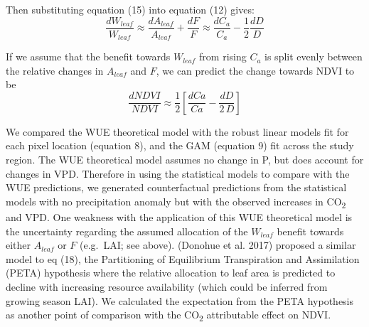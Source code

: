 \documentclass[
]{article}
\begin{document}
Then substituting equation (15) into equation (12) gives:
\begin{equation}
\frac{dW_{leaf}}{W_{leaf}} \approx  \frac{dA_{leaf}}{A_{leaf}} + \frac{dF}{F} \approx \frac{dC_a}{C_a} - \frac{1}{2}\frac{dD}{D}
\end{equation}

If we assume that the benefit towards \(W_{leaf}\) from rising \(C_a\)
is split evenly between the relative changes in \(A_{leaf}\) and \(F\),
we can predict the change towards NDVI to be \begin{equation}
\frac{dNDVI}{NDVI} \approx \frac{1}{2}[\frac{dCa}{Ca}-\frac{dD}{2\,D}]
\end{equation}

We compared the WUE theoretical model with the robust linear models fit
for each pixel location (equation 8), and the GAM (equation 9) fit
across the study region. The WUE theoretical model assumes no change in
P, but does account for changes in VPD. Therefore in using the
statistical models to compare with the WUE predictions, we generated
counterfactual predictions from the statistical models with no
precipitation anomaly but with the observed increases in
CO\textsubscript{2} and VPD. One weakness with the application of this
WUE theoretical model is the uncertainty regarding the assumed
allocation of the \(W_{leaf}\) benefit towards either \(A_{leaf}\) or
\(F\) (e.g.~LAI; see above). (Donohue et al. 2017) proposed a similar
model to eq (18), the Partitioning of Equilibrium Transpiration and
Assimilation (PETA) hypothesis where the relative allocation to leaf
area is predicted to decline with increasing resource availability
(which could be inferred from growing season LAI). We calculated the
expectation from the PETA hypothesis as another point of comparison with
the CO\textsubscript{2} attributable effect on NDVI.
\end{document}
